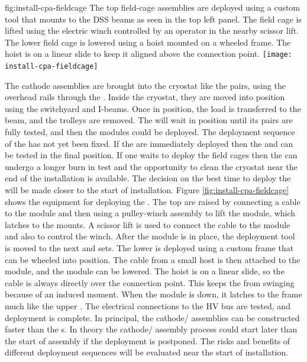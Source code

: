 \begin{dunefigure}{fig:install-cpa-fieldcage}
  {The top field-cage assemblies are deployed using a custom tool that mounts to the DSS beams as seen in the top left panel. The field cage is lifted using the electric winch controlled by an operator in the nearby scissor lift. The lower field cage is lowered using a hoist mounted on a wheeled frame. The hoist is on a linear slide to keep it aligned above the connection point.}
\texttt{[image: install-cpa-fieldcage]}
\end{dunefigure}

The cathode  assemblies are brought into the cryostat like the  pairs, using the overhead rails through the . Inside the cryostat, they are moved into position using the  switchyard and  I-beams. 
Once in position, the load is transferred to the  beam, and the trolleys are removed. 
The  will wait in position until its  pairs are fully tested, and then the  modules could be deployed. 
The deployment sequence of the  has not yet been fixed. 
If the  are immediately deployed then the  and  can be tested in the final position. 
If one waits to deploy the field cages then the  can undergo a longer burn in test and the opportunity to clean the cryostat near the end of the installation is available. The decision on the best time to deploy the  will be made closer to the start of installation.
Figure \ref{fig:install-cpa-fieldcage} shows the equipment for deploying the . 
The top  are raised by connecting a cable to the module and then using a pulley-winch assembly to lift the module, which latches to the  mounts. 
A scissor lift is used to connect the cable to the module and also to control the winch. 
After the module is in place, the deployment tool is moved to the next and  sets. 
The lower  is deployed using a custom frame that can be wheeled into position. 
The cable from a small host is then attached to the  module, and the module can be lowered. 
The hoist is on a linear slide, so the cable is always directly over the connection point. 
This keeps the  from swinging because of an induced moment. 
When the module is down, it latches to the  frame much like the upper . 
The electrical connections to the HV bus are tested, and deployment is complete. 
In principal, the cathode/ assemblies can be constructed faster than the s. 
In theory the cathode/ assembly process could start later than the start of  assembly if the deployment is postponed. 
 The risks and benefits of different deployment sequences will be evaluated near the start of installation.

